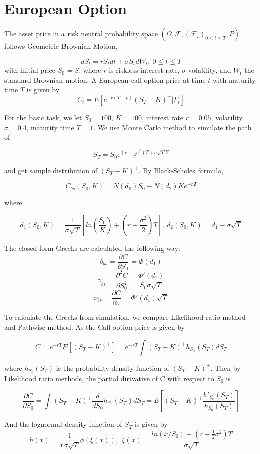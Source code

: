 \documentclass[11pt,a4paper,fleqn,draft]{article}
\begin{document}
\FloatBarrier

\section{European Option}


The asset price in a risk neutral probability space $(\Omega, \mathcal{F}, (\mathcal{F}_t)_{0\leq t\leq T}, P)$ follows Geometric Brownian Motion,

$$dS_t=rS_tdt+\sigma S_tdW_t, \ 0\leq t \leq T$$
with initial price $S_0 = S$, where $r$ is riskless interest rate, $\sigma$ volatility, and $W_t$ the standard Brownian motion. A European call option price at time $t$ with maturity time $T$ is given by
$$C_t = E[e^{-r(T-t)}(S_T-K)^+|\textit{F}_t]$$

For the basic task, we let $S_0 = 100$, $K=100$, interest rate $r = 0.05$, volatility $\sigma = 0.4$, maturity time $T =1$. We use Monte Carlo method to simulate the path of

$$S_T=S_0e^{(r-\frac{1}{2}\sigma ^2)T+\sigma \sqrt{T}Z} $$

and get sample distribution of $(S_T-K)^+$. By Black-Scholes formula,


$$C_{bs}(S_0, K) = N(d_1)S_0 - N(d_2)Ke^{-rT}$$

where

$$d_1(S_0,K)=\frac{1}{\sigma \sqrt{T}}[ln(\frac{S_0}{K})+(r+\frac{\sigma^2}{2})T],\ d_2(S_0,K) = d_1-\sigma \sqrt{T}$$

The closed-form Greeks are calculated the following way:
$$\delta_{bs} = \frac{\partial C}{\partial S_0}=\Phi(d_1) $$
$$\gamma_{bs} = \frac{\partial^2 C}{\partial S_0^2}=\frac{\Phi'(d_1)}{S_0\sigma \sqrt{T}}$$
$$\nu_{bs} =  \frac{\partial C}{\partial \sigma}=\Phi'(d_1)\sqrt{T}$$

To calculate the Greeks from simulation, we compare Likelihood ratio method and Pathwise method. As the Call option price is given by

$$C = e^{-rT}E[(S_T-K)^+]=e^{-rT}\int(S_T-K)^+ h_{S_0}(S_T) dS_T$$

where $ h_{S_0}(S_T)$ is the probability density function of $(S_T-K)^+$. Then by Likelihood ratio methods, the partial dirivative of C with respect to $S_0$ is

$$\frac{\partial C}{\partial S_0}=\int(S_T-K)^+\frac{d}{dS_0}h_{S_0}(S_T) dS_T=E[(S_T-K)^+\frac{h'_{S_0}(S_T)}{h_{S_0}(S_T)}] $$

And the lognormal density function of $S_T$ is given by
$$h(x)=\frac{1}{x\sigma \sqrt{T}}\phi(\xi(x)), \ \ \xi(x)=\frac{ln(x/S_0)-(r-\frac{1}{2}\sigma^2)T}{\sigma \sqrt{T}}  $$
\end{document}
